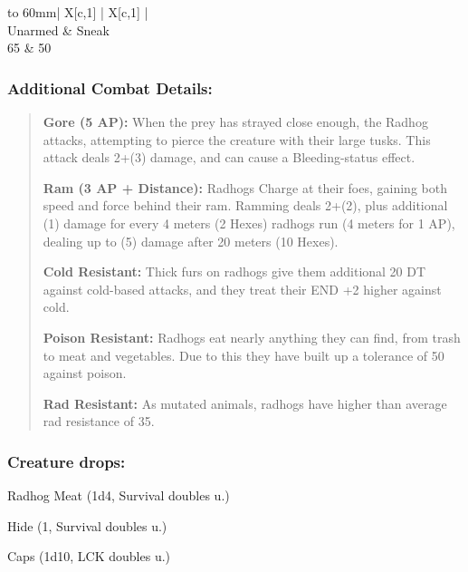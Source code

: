 \documentclass[11pt,a4paper,twocolumn]{book}
\begin{document}
	\bigskip
	{
		\begin{tabu} to 60mm{| X[c,1] | X[c,1] |}
			\hline
			 \\ \hline
			Unarmed & Sneak                          \\
			65      & 50                             \\ \hline
		\end{tabu}
		
	}
	
	\subsubsection*{Additional Combat Details:}
	\begin{verse}
		\textbf{Gore (5 AP):} When the prey has strayed close enough, the Radhog attacks, attempting to pierce the creature with their large tusks. This attack deals 2+(3) damage, and can cause a Bleeding-status effect. 
		
		\textbf{Ram (3 AP + Distance):} Radhogs Charge at their foes, gaining both speed and force behind their ram. Ramming deals 2+(2), plus additional (1) damage for every 4 meters (2 Hexes) radhogs run (4 meters for 1 AP), dealing up to (5) damage after 20 meters (10 Hexes). 
		
		\textbf{Cold Resistant:} Thick furs on radhogs give them additional 20 DT against cold-based attacks, and they treat their END +2 higher against cold.
		
		\textbf{Poison Resistant:} Radhogs eat nearly anything they can find, from trash to meat and vegetables. Due to this they have built up a tolerance of 50 against poison.
		
		\textbf{Rad Resistant:} As mutated animals, radhogs have higher than average rad resistance of 35.
	\end{verse}
	
	\subsubsection*{Creature drops:}
	\begin{compactitem}
		\item Radhog Meat (1d4, Survival doubles u.)
		\item Hide (1, Survival doubles u.)
		\item Caps (1d10, LCK doubles u.)
	\end{compactitem}
	
\end{document}
